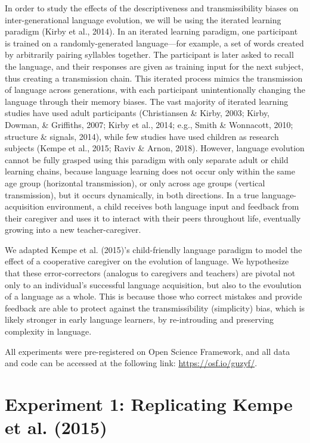 \documentclass[10pt, letterpaper]{article}
\begin{document}
In order to study the effects of the descriptiveness and
transmissibility biases on inter-generational language evolution, we
will be using the iterated learning paradigm (Kirby et al., 2014). In an
iterated learning paradigm, one participant is trained on a
randomly-generated language---for example, a set of words created by
arbitrarily pairing syllables together. The participant is later asked
to recall the language, and their responses are given as training input
for the next subject, thus creating a transmission chain. This iterated
process mimics the transmission of language across generations, with
each participant unintentionally changing the language through their
memory biases. The vast majority of iterated learning studies have used
adult participants (Christiansen \& Kirby, 2003; Kirby, Dowman, \&
Griffiths, 2007; Kirby et al., 2014; e.g., Smith \& Wonnacott, 2010;
structure \& signals, 2014), while few studies have used children as
research subjects (Kempe et al., 2015; Raviv \& Arnon, 2018). However,
language evolution cannot be fully grasped using this paradigm with only
separate adult or child learning chains, because language learning does
not occur only within the same age group (horizontal transmission), or
only across age groups (vertical transmission), but it occurs
dynamically, in both directions. In a true language-acquisition
environment, a child receives both language input and feedback from
their caregiver and uses it to interact with their peers throughout
life, eventually growing into a new teacher-caregiver.

We adapted Kempe et al. (2015)'s child-friendly language paradigm to
model the effect of a cooperative caregiver on the evolution of
language. We hypothesize that these error-correctors (analogus to
caregivers and teachers) are pivotal not only to an individual's
successful language acquisition, but also to the evoulution of a
language as a whole. This is because those who correct mistakes and
provide feedback are able to protect against the transmissibility
(simplicity) bias, which is likely stronger in early language learners,
by re-introuding and preserving complexity in language.

All experiments were pre-registered on Open Science Framework, and all
data and code can be accessed at the following link:
\url{https://osf.io/guzyf/}.

\section{Experiment 1: Replicating Kempe et al.
(2015)}\label{experiment-1-replicating-kempe-2015}
\end{document}
